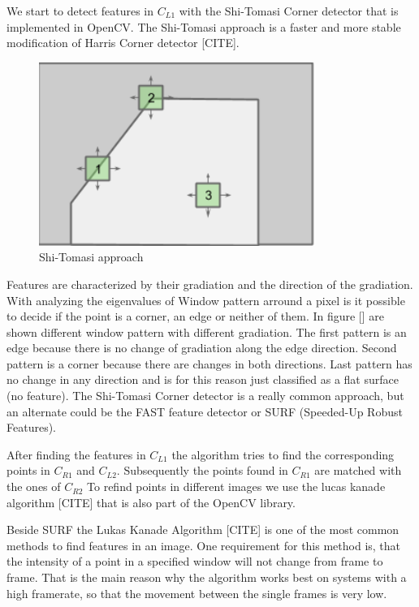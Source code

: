 \documentclass[11pt]{article}
\begin{document}
	We start to detect features in $C_{L1}$ with the Shi-Tomasi Corner detector that is implemented in OpenCV. The Shi-Tomasi approach is a faster and more stable modification of Harris Corner detector [CITE]. 

	\begin{figure}[ht!]
		\centering
		\includegraphics[width=90mm]{images/tomasi.png}
		\caption{Shi-Tomasi approach \label{overflow}}
	\end{figure}

	Features are characterized by their gradiation and the direction of the gradiation. With analyzing the eigenvalues of Window pattern arround a pixel is it possible to decide if the point is a corner, an edge or neither of them. In figure [] are shown different window pattern with different gradiation. The first pattern is an edge because there is no change of gradiation along the edge direction. Second pattern is a corner because there are changes in both directions. Last pattern has no change in any direction and is for this reason just classified as a flat surface (no feature). The Shi-Tomasi Corner detector is a really common approach, but an alternate could be the FAST feature detector or SURF (Speeded-Up Robust Features). 

	After finding the features in $C_{L1}$ the algorithm tries to find the corresponding points in $C_{R1}$ and $C_{L2}$. Subsequently the points found in $C_{R1}$ are matched with the ones of $C_{R2}$
	To refind points in different images we use the lucas kanade algorithm [CITE] that is also part of the OpenCV library. 

	Beside SURF the Lukas Kanade Algorithm [CITE] is one of the most common methods to find features in an image. One requirement for this method is, that the intensity of a point in a specified window will not change from frame to frame. That is the main reason why the algorithm works best on systems with a high framerate, so that the movement between the single frames is very low.
\end{document}
